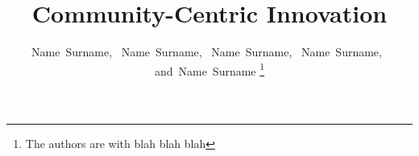 \documentclass[journal]{IEEEtran}
\begin{document}
%
\title{Community-Centric Innovation}
%
%
%

\author{
	Name~Surname,~%
    Name~Surname,~%
    Name~Surname,~%
    Name~Surname,~%
    and~Name~Surname%
\thanks{The authors are with\newline
blah \newline
blah \newline
blah}%
}


% 
%



% 
\end{document}
